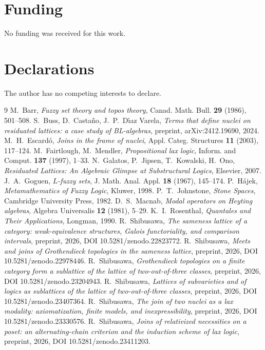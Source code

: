 \documentclass[11pt]{amsart}
\theoremstyle{definition}
\begin{document}
\section*{Funding}
No funding was received for this work.

\section*{Declarations}
The author has no competing interests to declare.

\begin{thebibliography}{9}
 M.~Barr, \emph{Fuzzy set theory and topos theory}, Canad.
Math. Bull. \textbf{29} (1986), 501--508.
 S.~Buss, D.~Casta\~no, J.~P.~D\'\i az Varela, \emph{Terms that
define nuclei on residuated lattices: a case study of BL-algebras}, preprint,
arXiv:2412.19690, 2024.
 M.~H.~Escard\'o, \emph{Joins in the frame of nuclei}, Appl.
Categ. Structures \textbf{11} (2003), 117--124.
 M.~Fairtlough, M.~Mendler, \emph{Propositional lax logic},
Inform. and Comput. \textbf{137} (1997), 1--33.
 N.~Galatos, P.~Jipsen, T.~Kowalski, H.~Ono, \emph{Residuated
Lattices: An Algebraic Glimpse at Substructural Logics}, Elsevier, 2007.
 J.~A.~Goguen, \emph{$L$-fuzzy sets}, J. Math. Anal. Appl.
\textbf{18} (1967), 145--174.
 P.~H\'ajek, \emph{Metamathematics of Fuzzy Logic}, Kluwer,
1998.
 P.~T.~Johnstone, \emph{Stone Spaces}, Cambridge University
Press, 1982.
 D.~S.~Macnab, \emph{Modal operators on Heyting algebras},
Algebra Universalis \textbf{12} (1981), 5--29.
 K.~I.~Rosenthal, \emph{Quantales and Their Applications},
Longman, 1990.
 R.~Shibusawa, \emph{The sameness lattice of a category:
weak-equivalence structures, Galois functoriality, and comparison intervals},
preprint, 2026, DOI 10.5281/zenodo.22823772.
 R.~Shibusawa, \emph{Meets and joins of Grothendieck
topologies in the sameness lattice}, preprint, 2026, DOI 10.5281/zenodo.22978446.
 R.~Shibusawa, \emph{Grothendieck topologies on a finite
category form a sublattice of the lattice of two-out-of-three classes},
preprint, 2026, DOI 10.5281/zenodo.23204943.
 R.~Shibusawa, \emph{Lattices of subvarieties and of
logics as sublattices of the lattice of two-out-of-three classes}, preprint,
2026, DOI 10.5281/zenodo.23407364.
 R.~Shibusawa, \emph{The join of two nuclei as a lax modality:
axiomatization, finite models, and inexpressibility}, preprint, 2026,
DOI 10.5281/zenodo.23330576.
 R.~Shibusawa, \emph{Joins of relativized necessities on a
poset: an alternating-chain criterion and the induction scheme of lax
logic}, preprint, 2026, DOI 10.5281/zenodo.23411203.
\end{thebibliography}
\end{document}
